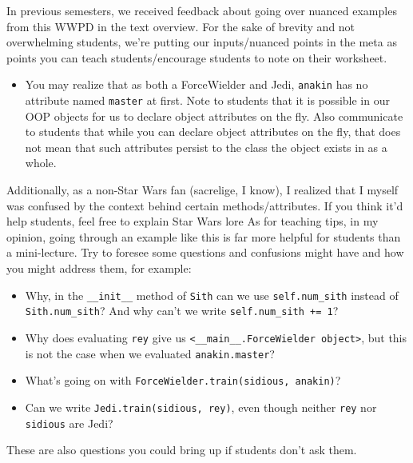 \begin{questionmeta}
In previous semesters, we received feedback about going over nuanced examples from this WWPD in the text overview. For the sake of brevity and not overwhelming students, we're putting our inputs/nuanced points in the meta as points you can teach students/encourage students to note on their worksheet. 
\begin{itemize}
    \item You may realize that as both a ForceWielder and Jedi, \lstinline{anakin} has no attribute named \lstinline{master} at first. Note to students that it is possible in our OOP objects for us to declare object attributes on the fly. Also communicate to students that while you can declare object attributes on the fly, that does not mean that such attributes persist to the class the object exists in as a whole.
\end{itemize}
Additionally, as a non-Star Wars fan (sacrelige, I know), I realized that I myself was confused by the context behind certain methods/attributes. If you think it'd help students, feel free to explain Star Wars lore
As for teaching tips, in my opinion, going through an example like this is far more helpful for students than a mini-lecture. Try to foresee some questions and confusions might have and how you might address them, for example:
\begin{itemize}
    \item Why, in the \lstinline{__init__} method of \lstinline{Sith} can we use \lstinline{self.num_sith} instead of \lstinline{Sith.num_sith}? And why can't we write \lstinline{self.num_sith += 1}?
    \item Why does evaluating \lstinline{rey} give us \lstinline{<__main__.ForceWielder object>}, but this is not the case when we evaluated \lstinline{anakin.master}? 
    \item What's going on with \lstinline{ForceWielder.train(sidious, anakin)}? 
    \item Can we write \lstinline{Jedi.train(sidious, rey)}, even though neither \lstinline{rey} nor \lstinline{sidious} are Jedi? 
\end{itemize}
These are also questions you could bring up if students don't ask them. 
\end{questionmeta}